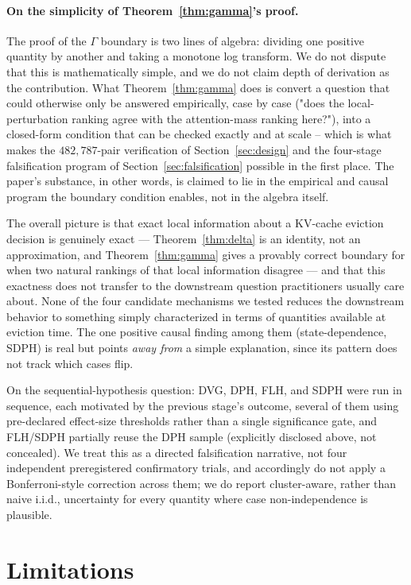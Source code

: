 \documentclass[11pt]{article}
\begin{document}
\paragraph{On the simplicity of Theorem~\ref{thm:gamma}'s proof.} The proof
of the $\Gamma$ boundary is two lines of algebra: dividing one positive
quantity by another and taking a monotone log transform. We do not dispute
that this is mathematically simple, and we do not claim depth of derivation
as the contribution. What Theorem~\ref{thm:gamma} does is convert a
question that could otherwise only be answered empirically, case by case
("does the local-perturbation ranking agree with the attention-mass ranking
here?"), into a closed-form condition that can be checked exactly and at
scale -- which is what makes the $482{,}787$-pair verification of
Section~\ref{sec:design} and the four-stage falsification program of
Section~\ref{sec:falsification} possible in the first place. The paper's
substance, in other words, is claimed to lie in the empirical and causal
program the boundary condition enables, not in the algebra itself.

The overall picture is that exact local information about a KV-cache
eviction decision is genuinely exact --- Theorem~\ref{thm:delta} is an
identity, not an approximation, and Theorem~\ref{thm:gamma} gives a provably
correct boundary for when two natural rankings of that local information
disagree --- and that this exactness does not transfer to the downstream
question practitioners usually care about. None of the four candidate
mechanisms we tested reduces the downstream behavior to something simply
characterized in terms of quantities available at eviction time. The one
positive causal finding among them (state-dependence, SDPH) is real but
points \emph{away from} a simple explanation, since its pattern does not
track which cases flip.

On the sequential-hypothesis question: DVG, DPH, FLH, and SDPH were run in
sequence, each motivated by the previous stage's outcome, several of them
using pre-declared effect-size thresholds rather than a single significance
gate, and FLH/SDPH partially reuse the DPH sample (explicitly disclosed
above, not concealed). We treat this as a directed falsification narrative,
not four independent preregistered confirmatory trials, and accordingly do
not apply a Bonferroni-style correction across them; we do report
cluster-aware, rather than naive i.i.d., uncertainty for every quantity
where case non-independence is plausible.

\section{Limitations}
\label{sec:limitations}
\end{document}
